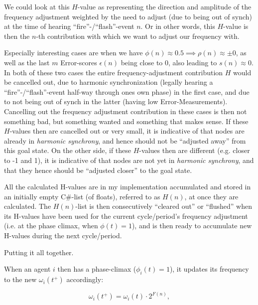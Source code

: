 			We could look at this $H$-value as representing the direction and amplitude of the frequency adjustment weighted by the need to adjust (due to being out of synch) at the time of hearing ``fire''-/``flash''-event $n$. Or in other words, this $H$-value is then the $n$-th contribution with which we want to adjust our frequency with.
			
			Especially interesting cases are when we have $\phi(n)\approx0.5 \implies \rho(n)\approx\pm0$, as well as the last $m$ Error-scores $\epsilon(n)$ being close to 0, also leading to $s(n)\approx0$. In both of these two cases the entire frequency-adjustment contribution $H$ would be cancelled out, due to harmonic synchronization (legally hearing a ``fire''-/``flash''-event half-way through ones own phase) in the first case, and due to not being out of synch in the latter (having low Error-Measurements). Cancelling out the frequency adjustment contribution in these cases is then not something bad, but something wanted and something that makes sense. If these $H$-values then are cancelled out or very small, it is indicative of that nodes are already in \textit{harmonic synchrony}, and hence should not be ``adjusted away'' from this goal state. On the other side, if these $H$-values then are different (e.g. closer to -1 and 1), it is indicative of that nodes are not yet in \textit{harmonic synchrony}, and that they hence should be ``adjusted closer'' to the goal state.
			
			All the calculated H-values are in my implementation accumulated and stored in an initially empty C\#-list (of floats), referred to as $H(n)$, at once they are calculated. The $H(n)$-list is then consecutively ``cleared out'' or ``flushed'' when its H-values have been used for the current cycle/period's frequency adjustment (i.e. at the phase climax, when $\phi(t)=1$), and is then ready to accumulate new H-values during the next cycle/period.
			
			
			Putting it all together.
			
			When an agent $i$ then has a phase-climax ($\phi_i(t)=1$), it updates its frequency to the new $\omega_i(t^+)$ accordingly:
			
			\begin{equation}
			\label{freq_adj}
				\omega_i(t^+) = \omega_i(t) \cdot 2^{F(n)},
			\end{equation}
			
